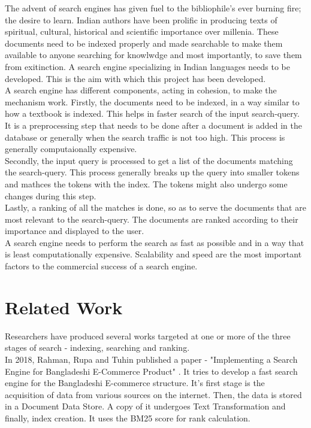 \documentclass[12pt]{article}
\begin{document}
	The advent of search engines has given fuel to the bibliophile's ever burning fire; the desire to learn. Indian authors have been prolific in producing texts of spiritual, cultural, historical and scientific importance over millenia. These documents need to be indexed properly and made searchable to make them available to anyone searching for knowlwdge and most importantly, to save them from exitinction. A search engine specializing in Indian languages needs to be developed. This is the aim with which this project has been developed.\\
	
	A search engine has different components, acting in cohesion, to make the mechanism work. Firstly, the documents need to be indexed, in a way similar to how a textbook is indexed. This helps in faster search of the input search-query. It is a preprocessing step that needs to be done after a document is added in the database or generally when the search traffic is not too high. This process is generally computaionally expensive.\\
	
	Secondly, the input query is processed to get a list of the documents matching the search-query. This process generally breaks up the query into smaller tokens and mathces the tokens with the index. The tokens might also undergo some changes during this step.\\
	
	Lastly, a ranking of all the matches is done, so as to serve the documents that are most relevant to the search-query. The documents are ranked according to their importance and displayed to the user.\\
	
	A search engine needs to perform the search as fast as possible and in a way that is least computationally expensive. Scalability and speed are the most important factors to the commercial success of a search engine.
	
	\pagebreak
	
	\section{Related Work}
	Researchers have produced several works targeted at one or more of the three stages of search - indexing, searching and ranking.  \\
	
	In 2018, Rahman, Rupa and Tuhin published a paper - "Implementing a Search Engine for Bangladeshi E-Commerce Product" \cite{ecom}. It tries to develop a fast search engine for the Bangladeshi E-commerce structure. It's first stage is the acquisition of data from various sources on the internet. Then, the data is stored in a Document Data Store. A copy of it undergoes Text Transformation  and finally, index creation. It uses the BM25 score for rank calculation. \\
	
\end{document}
